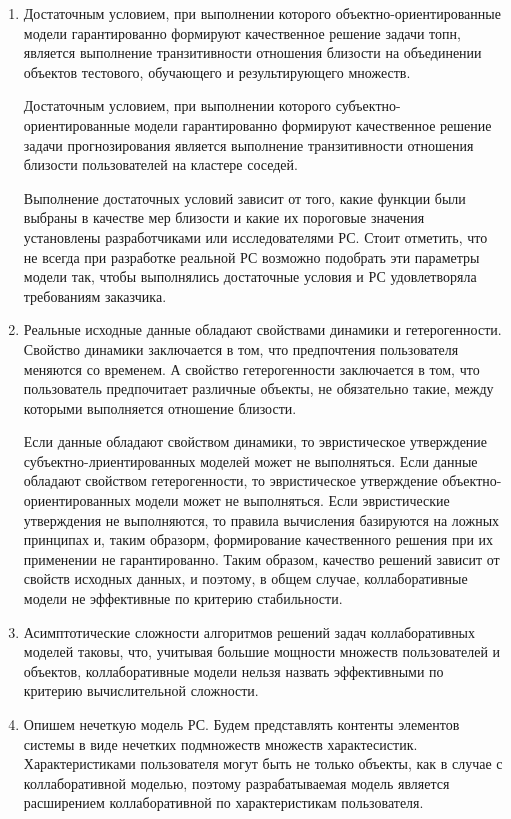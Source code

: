 \documentclass[a4paper,11pt]{proc}
\begin{document}
{\begin{enumerate}
	\item
		Достаточным условием, при выполнении которого
		объектно-ориентированные модели гарантированно формируют
		качественное решение задачи топн, является выполнение транзитивности
		отношения близости на объединении объектов
		тестового, обучающего и результирующего множеств.

		Достаточным условием, при выполнении которого
		субъектно-ориентированные модели гарантированно формируют
		качественное решение задачи прогнозирования является выполнение
		транзитивности отношения близости пользователей на кластере соседей.

		Выполнение достаточных условий зависит от того,
		какие функции были выбраны в качестве мер близости
		и какие их пороговые значения установлены разработчиками или
		исследователями РС. Стоит отметить, что не всегда при разработке
		реальной РС возможно подобрать эти параметры модели так,
		чтобы выполнялись достаточные условия и РС удовлетворяла
		требованиям заказчика.

	\item Реальные исходные данные обладают свойствами динамики и
		гетерогенности. Свойство динамики заключается в том, что предпочтения
		пользователя меняются со временем. А свойство гетерогенности
		заключается в том, что пользователь предпочитает различные объекты, не
		обязательно такие, между которыми выполняется отношение близости.

		Если данные обладают свойством динамики, то эвристическое утверждение
		субъектно-лриентированных моделей может не выполняться.
		Если данные обладают свойством гетерогенности, то эвристическое утверждение
		объектно-ориентированных модели может не выполняться.
		Если эвристические утверждения не выполняются, то правила вычисления
		базируются на ложных принципах и, таким образорм, формирование качественного
		решения при их применении не гарантированно. Таким образом, качество решений
		зависит от свойств исходных данных, и поэтому, в общем случае, коллаборативные модели не
		эффективные по критерию стабильности.

	\item Асимптотические сложности алгоритмов решений задач
		коллаборативных моделей таковы, что, учитывая большие
		мощности множеств пользователей и объектов, коллаборативные
		модели нельзя назвать эффективными по критерию вычислительной
		сложности.

	\item Опишем нечеткую модель РС.
		Будем представлять контенты элементов системы в виде нечетких
		подмножеств множеств характесистик.
		Характеристиками пользователя могут быть не
		только объекты, как в случае с коллаборативной моделью,
		поэтому разрабатываемая модель является расширением
		коллаборативной по характеристикам пользователя.


\end{enumerate}}
\end{document}
